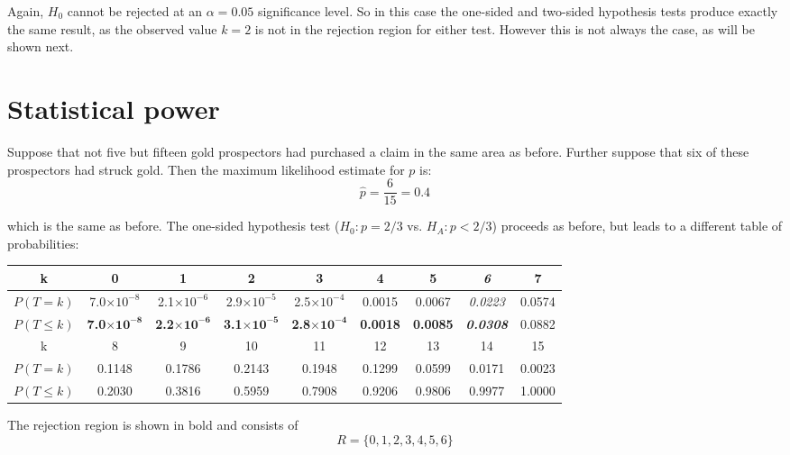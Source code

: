 Again, $H_0$ cannot be rejected at an $\alpha=0.05$ significance
level.  So in this case the one-sided and two-sided hypothesis tests
produce exactly the same result, as the observed value $k=2$ is not in
the rejection region for either test. However this is not always the
case, as will be shown next.

\section{Statistical power}
\label{sec:power}

Suppose that not five but fifteen gold prospectors had purchased a
claim in the same area as before. Further suppose that six of these
prospectors had struck gold. Then the maximum likelihood estimate for
$p$ is:
\[
\hat{p} = \frac{6}{15} = 0.4
\]

\noindent which is the same as before. The one-sided hypothesis test
($H_0: p={2/3}$ vs. $H_{\!A}: p<2/3$) proceeds as before, but leads to
a different table of probabilities:

\begin{center}
  \begin{tabular}{c@{\gap}c@{\gap}c@{\gap}c@{\gap}c@{\gap}c@{\gap}c@{\gap}c@{\gap}c}
    k & \textbf{0} & \textbf{1} & \textbf{2} & \textbf{3} & \textbf{4}
    & \textbf{5} & \textbf{\textit{6}} & 7 \\ \hline $P(T=k)$ &
    7.0$\times{10}^{-8}$ & 2.1$\times{10}^{-6}$ & 2.9$\times{10}^{-5}$
    & 2.5$\times{10}^{-4}$ & 0.0015 & 0.0067 & \textit{0.0223} & 0.0574 \\
    $P({T}\leq{k})$ & \textbf{7.0}$\mathbf{\times{10}^{-8}}$
    & \textbf{2.2}$\mathbf{\times{10}^{-6}}$ &
    \textbf{3.1}$\mathbf{\times{10}^{-5}}$ &
    \textbf{2.8}$\mathbf{\times{10}^{-4}}$ & \textbf{0.0018} &
    \textbf{0.0085} & \textbf{\textit{0.0308}} & 0.0882 \\
    k & 8 & 9 & 10 & 11 & 12 & 13 & 14 & 15 \\
    \hline $P(T=k)$ & 0.1148 & 0.1786 & 0.2143
    & 0.1948 & 0.1299 & 0.0599 & 0.0171 & 0.0023 \\
    $P({T}\leq{k})$ & 0.2030 & 0.3816 & 0.5959 & 0.7908 &
    0.9206 & 0.9806 & 0.9977 & 1.0000
  \end{tabular}
\end{center}

The rejection region is shown in bold and consists of
\begin{equation}
  R=\{0,1,2,3,4,5,6\}
  \label{eq:1sidedbinomtest15}
\end{equation}


